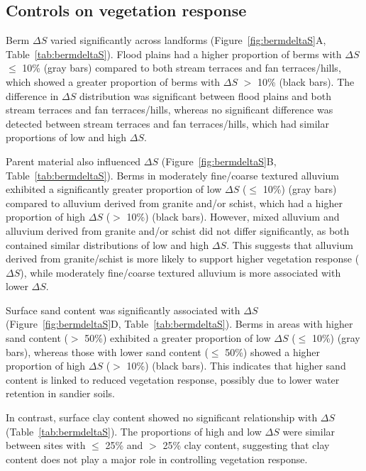 \documentclass[review]{elsarticle}
\begin{document}
\subsection{Controls on vegetation response}

Berm $\Delta S$ varied significantly across landforms (Figure~\ref{fig:bermdeltaS}A, Table~\ref{tab:bermdeltaS}). Flood plains had a higher proportion of berms with $\Delta S$ $\leq$ 10\% (gray bars) compared to both stream terraces and fan terraces/hills, which showed a greater proportion of berms with $\Delta S$ $>$ 10\% (black bars). The difference in $\Delta S$ distribution was significant between flood plains and both stream terraces and fan terraces/hills, whereas no significant difference was detected between stream terraces and fan terraces/hills, which had similar proportions of low and high $\Delta S$.

Parent material also influenced $\Delta S$ (Figure~\ref{fig:bermdeltaS}B, Table~\ref{tab:bermdeltaS}). Berms in moderately fine/coarse textured alluvium exhibited a significantly greater proportion of low $\Delta S$ ($\leq$ 10\%) (gray bars) compared to alluvium derived from granite and/or schist, which had a higher proportion of high $\Delta S$ ($>$ 10\%) (black bars). However, mixed alluvium and alluvium derived from granite and/or schist did not differ significantly, as both contained similar distributions of low and high $\Delta S$. This suggests that alluvium derived from granite/schist is more likely to support higher vegetation response ($\Delta S$), while moderately fine/coarse textured alluvium is more associated with lower $\Delta S$.

Surface sand content was significantly associated with $\Delta S$ (Figure~\ref{fig:bermdeltaS}D, Table~\ref{tab:bermdeltaS}). Berms in areas with higher sand content ($>$ 50\%) exhibited a greater proportion of low $\Delta S$ ($\leq$ 10\%) (gray bars), whereas those with lower sand content ($\leq$ 50\%) showed a higher proportion of high $\Delta S$ ($>$ 10\%) (black bars). This indicates that higher sand content is linked to reduced vegetation response, possibly due to lower water retention in sandier soils.

In contrast, surface clay content showed no significant relationship with $\Delta S$ (Table~\ref{tab:bermdeltaS}). The proportions of high and low $\Delta S$ were similar between sites with $\leq$ 25\% and $>$ 25\% clay content, suggesting that clay content does not play a major role in controlling vegetation response.
\end{document}
